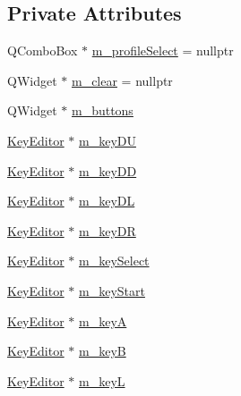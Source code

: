 \subsection*{Private Attributes}
\begin{DoxyCompactItemize}
\item 
Q\+Combo\+Box $\ast$ \mbox{\hyperlink{class_q_g_b_a_1_1_g_b_a_key_editor_a07047a0bf229661aa21d7cfa72322011}{m\+\_\+profile\+Select}} = nullptr
\item 
Q\+Widget $\ast$ \mbox{\hyperlink{class_q_g_b_a_1_1_g_b_a_key_editor_af1ad3b752fae9ee198031eb21fcb7547}{m\+\_\+clear}} = nullptr
\item 
Q\+Widget $\ast$ \mbox{\hyperlink{class_q_g_b_a_1_1_g_b_a_key_editor_a4e61add569fce457b1debfc788166bc7}{m\+\_\+buttons}}
\item 
\mbox{\hyperlink{class_q_g_b_a_1_1_key_editor}{Key\+Editor}} $\ast$ \mbox{\hyperlink{class_q_g_b_a_1_1_g_b_a_key_editor_a2e7675c3670d3ea496e62228ce9542d4}{m\+\_\+key\+DU}}
\item 
\mbox{\hyperlink{class_q_g_b_a_1_1_key_editor}{Key\+Editor}} $\ast$ \mbox{\hyperlink{class_q_g_b_a_1_1_g_b_a_key_editor_af3a861dd5db50f94a5a9fa5894ead69b}{m\+\_\+key\+DD}}
\item 
\mbox{\hyperlink{class_q_g_b_a_1_1_key_editor}{Key\+Editor}} $\ast$ \mbox{\hyperlink{class_q_g_b_a_1_1_g_b_a_key_editor_a37450f382e441692d1aa9e33f744048f}{m\+\_\+key\+DL}}
\item 
\mbox{\hyperlink{class_q_g_b_a_1_1_key_editor}{Key\+Editor}} $\ast$ \mbox{\hyperlink{class_q_g_b_a_1_1_g_b_a_key_editor_ac1ee4559ee68bc5ac983c553ad45b3b3}{m\+\_\+key\+DR}}
\item 
\mbox{\hyperlink{class_q_g_b_a_1_1_key_editor}{Key\+Editor}} $\ast$ \mbox{\hyperlink{class_q_g_b_a_1_1_g_b_a_key_editor_a2f29cb8d01bd17b8e32664e3999f750b}{m\+\_\+key\+Select}}
\item 
\mbox{\hyperlink{class_q_g_b_a_1_1_key_editor}{Key\+Editor}} $\ast$ \mbox{\hyperlink{class_q_g_b_a_1_1_g_b_a_key_editor_a9fbf52dbc3ae7d78ed1a5e7d7cd3bdf0}{m\+\_\+key\+Start}}
\item 
\mbox{\hyperlink{class_q_g_b_a_1_1_key_editor}{Key\+Editor}} $\ast$ \mbox{\hyperlink{class_q_g_b_a_1_1_g_b_a_key_editor_ae6970654daec654fd17ee296e9a9f00c}{m\+\_\+keyA}}
\item 
\mbox{\hyperlink{class_q_g_b_a_1_1_key_editor}{Key\+Editor}} $\ast$ \mbox{\hyperlink{class_q_g_b_a_1_1_g_b_a_key_editor_ac0c7382b9fc1de3b29a9a4b3e0d1eb8d}{m\+\_\+keyB}}
\item 
\mbox{\hyperlink{class_q_g_b_a_1_1_key_editor}{Key\+Editor}} $\ast$ \mbox{\hyperlink{class_q_g_b_a_1_1_g_b_a_key_editor_a7d70baa2f1796676f09dc0e9f7a26244}{m\+\_\+keyL}}

\end{DoxyCompactItemize}
